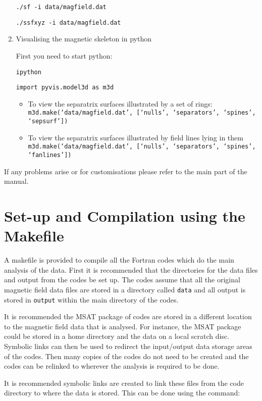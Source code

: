 \documentclass[12pt]{article}
\begin{document}
\begin{enumerate}
      \texttt{./sf -i data/magfield.dat}

      \texttt{./ssfxyz -i data/magfield.dat}

      \item Visualising the magnetic skeleton in python

      First you need to start python:

      \texttt{ipython}

      \texttt{import pyvis.model3d as m3d}

      \begin{itemize}
        \item To view the separatrix surfaces illustrated by a set of rings:
        \texttt{m3d.make(`data/magfield.dat', [`nulls', `separators', `spines', `sepsurf'])}
        \item To view the separatrix surfaces illustrated by field lines lying in them
        \texttt{m3d.make(`data/magfield.dat', [`nulls', `separators', `spines', `fanlines'])}
      \end{itemize}
    \end{enumerate}
    If any problems arise or for customisations please refer to the main part of the manual.

  \section{Set-up and Compilation using the Makefile}

    A makefile is provided to compile all the Fortran codes which do the main analysis of the data. First it is recommended that the directories for the data files and output from the codes be set up. The codes assume that all the original magnetic field data files are stored in a directory called \texttt{data} and all output is stored in \texttt{output} within the main directory of the codes.

    It is recommended the MSAT package of codes are stored in a different location to the magnetic field data that is analysed. For instance, the MSAT package could be stored in a home directory and the data on a local scratch disc. Symbolic links can then be used to redirect the input/output data storage areas of the codes. Then many copies of the codes do not need to be created and the codes can be relinked to wherever the analysis is required to be done.

    It is recommended symbolic links are created to link these files from the code directory to where the data is stored. This can be done using the command:
\end{document}
